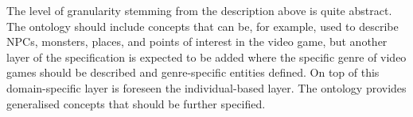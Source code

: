 The level of granularity
%
stemming from the description above is quite abstract. The ontology should include concepts that can be, for example, used to describe \acp{NPC}, monsters, places, and points of interest in the video game, but another layer of the specification is expected to be added where the specific genre of video games should be described and genre-specific entities defined. On top of this domain-specific layer is foreseen the individual-based layer. The \given ontology provides generalised concepts that should be further specified.
